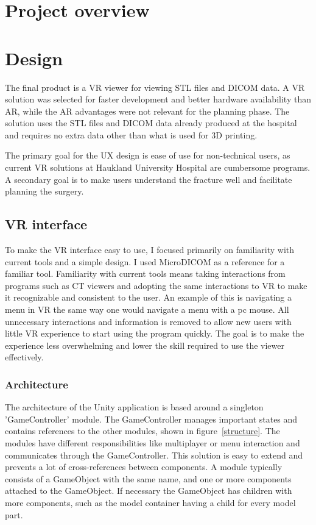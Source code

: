 \documentclass[a4paper]{report}
\begin{document}
\section{Project overview}\label{CodeStructure}

\section{Design}


The final product is a VR viewer for viewing STL files and DICOM data. A VR solution was selected for faster development and better hardware availability than AR, while the AR advantages were not relevant for the planning phase.
The solution uses the STL files and DICOM data already produced at the hospital and requires no extra data other than what is used for 3D printing.

The primary goal for the UX design is ease of use for non-technical users, as current VR solutions at Haukland University Hospital are cumbersome programs.
A secondary goal is to make users understand the fracture well and facilitate planning the surgery.

\subsection{VR interface}


To make the VR interface easy to use, I focused primarily on familiarity with current tools and a simple design.
I used MicroDICOM\cite{noauthor_dicom_nodate-1} as a reference for a familiar tool.
Familiarity with current tools means taking interactions from programs such as CT viewers and adopting the same interactions to VR to make it recognizable and consistent to the user. An example of this is navigating a menu in VR the same way one would navigate a menu with a pc mouse.
 All unnecessary interactions and information is removed to allow new users with little VR experience to start using the program quickly. The goal is to make the experience less overwhelming and lower the skill required to use the viewer effectively.

\subsubsection{Architecture}
The architecture of the Unity application is based around a singleton 'GameController' module. The GameController manages important states and contains references to the other modules, shown in figure~\ref{structure}. The modules have different responsibilities like multiplayer or menu interaction and communicates through the GameController. This solution is easy to extend and prevents a lot of cross-references between components.
A module typically consists of a GameObject with the same name, and one or more components attached to the GameObject. If necessary the GameObject has children with more components, such as the model container having a child for every model part.
\end{document}

